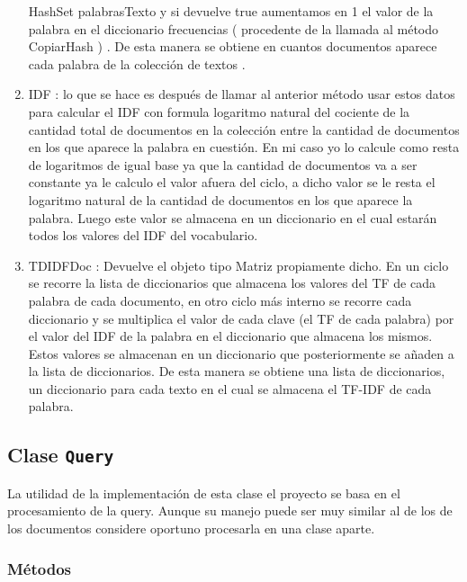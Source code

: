 \documentclass[10pt]{extarticle}
\begin{document}
\begin{enumerate}
   HashSet palabrasTexto y si devuelve true aumentamos en 1 el valor de la palabra en el diccionario 
   frecuencias ( procedente de la llamada al método CopiarHash ) . De esta manera se obtiene en 
   cuantos documentos aparece cada palabra de la colección de textos .
   \item IDF : lo que se hace es después de llamar al anterior método usar estos datos para 
   calcular el IDF con formula logaritmo natural del cociente de la cantidad total de documentos en la 
   colección entre la cantidad de documentos en los que aparece la palabra en cuestión. En mi caso 
   yo lo calcule como resta de logaritmos de igual base ya que la cantidad de documentos va a ser 
   constante ya le calculo el valor afuera del ciclo, a dicho valor se le resta el logaritmo natural de la 
   cantidad de documentos en los que 
   aparece la palabra. Luego este valor se almacena en un diccionario en el cual estarán todos los 
   valores del IDF del vocabulario. 
   \item TDIDFDoc : Devuelve el objeto tipo Matriz propiamente dicho. En  un ciclo se recorre la lista de diccionarios que almacena los valores del TF de cada palabra de cada documento, en otro ciclo más interno se recorre cada diccionario y se multiplica el valor de cada 
   clave (el TF de cada palabra) por el valor del IDF de la palabra en el diccionario que almacena los mismos. Estos valores se almacenan en un diccionario que posteriormente se añaden a la lista de  diccionarios. De esta manera se obtiene una lista de diccionarios, un diccionario para cada texto en el cual se almacena el TF-IDF de cada palabra. 
   
\end{enumerate}

\subsection{Clase \texttt{Query}}\label{sub:query}

La utilidad de la implementación de esta clase el proyecto se basa en el procesamiento de la 
query. Aunque su manejo puede ser muy similar al de los de los documentos considere oportuno 
procesarla en una clase aparte.

\subsubsection{Métodos}
\end{document}
